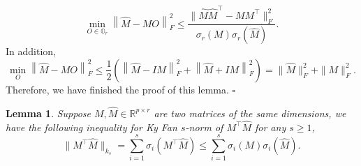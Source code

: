 \documentclass[11pt]{article}
\newtheorem{Lemma}{Lemma}
\newcommand{\0}{{\mathbf{0}}}
\newcommand{\1}{{\mathbf{1}}}
\begin{document}
\begin{equation*}
\min_{O\in \mathbb{O}_r} \left\| \hat{M} - MO\right\|_F^2 \leq \frac{\|\hat{M}\hat{M}^\top - MM^\top\|_F^2}{\sigma_r(M)\sigma_r(\hat{M})}.
\end{equation*}
In addition, 
\begin{equation*}
\min_O \left\|\hat{M} - MO\right\|_F^2 \leq \frac{1}{2}\left(\left\|\hat{M} - IM\right\|_F^2 + \left\|\hat{M} + IM\right\|_F^2\right) = \|\hat{M}\|_F^2 + \|M\|_F^2.
\end{equation*}
Therefore, we have finished the proof of this lemma.
\quad $\square$

\begin{Lemma}\label{lm:Hy-fan-norm}
	Suppose $M, \hat{M} \in \mathbb{R}^{p\times r}$ are two matrices of the same dimensions, we have the following inequality for Ky Fan $s$-norm of $M^\top\hat{M}$ \citep{fan1950theorem} for any $s\geq 1$,
	\begin{equation*}
	\|M^\top \hat{M}\|_{k_s} = \sum_{i=1}^s \sigma_i(M^\top \hat{M}) \leq \sum_{i=1}^s \sigma_i(M)\sigma_i(\hat{M}).
	\end{equation*}
\end{Lemma}
\end{document}
